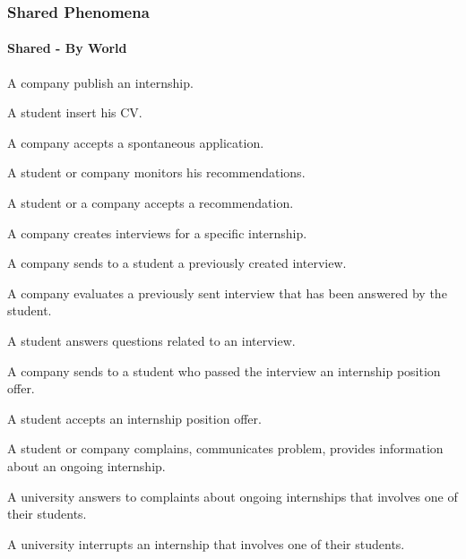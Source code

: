 \subsubsection{Shared Phenomena}
\paragraph{Shared - By World}
\begin{enumerate}[label={\color{titleColor}[SPW\arabic*]}]
\item A company publish an internship.
\item A student insert his CV.
\item A company accepts a spontaneous application.
\item A student or company monitors his recommendations.
\item A student or a company accepts a recommendation.
\item A company creates interviews for a specific internship.
\item A company sends to a student a previously created interview.
\item A company evaluates a previously sent interview that has been answered by the student.
\item A student answers questions related to an interview.
\item A company sends to a student who passed the interview an internship position offer.
\item A student accepts an internship position offer.
\item A student or company complains, communicates problem, provides information about an ongoing internship.
\item A university answers to complaints about ongoing internships that involves one of their students.
\item A university interrupts an internship that involves one of their students.
\end{enumerate}
